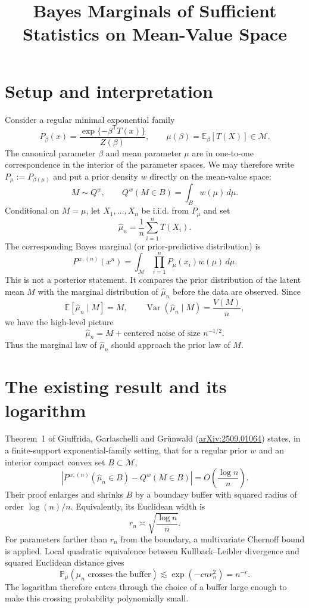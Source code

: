 \documentclass[11pt]{article}
\title{Bayes Marginals of Sufficient Statistics on Mean-Value Space}
\author{}
\date{}
\newcommand{\M}{\mathcal M}
\newcommand{\E}{\mathbb E}
\newcommand{\Pp}{\mathbb P}
\begin{document}
\maketitle

\section{Setup and interpretation}

Consider a regular minimal exponential family
\[
  P_{\beta}(x)
  =\frac{\exp\{-\beta^{\mathsf T}T(x)\}}{Z(\beta)},
  \qquad
  \mu(\beta)=\E_{\beta}[T(X)]\in\M.
\]
The canonical parameter $\beta$ and mean parameter $\mu$ are in one-to-one
correspondence in the interior of the parameter spaces.  We may therefore
write $P_{\mu}:=P_{\beta(\mu)}$ and put a prior density $w$ directly on the
mean-value space:
\[
  M\sim Q^w,\qquad Q^w(M\in B)=\int_B w(\mu)\,d\mu.
\]
Conditional on $M=\mu$, let $X_1,\ldots,X_n$ be i.i.d. from $P_\mu$ and set
\[
  \widehat\mu_n=\frac1n\sum_{i=1}^nT(X_i).
\]
The corresponding Bayes marginal (or prior-predictive distribution) is
\[
  P^{w,(n)}(x^n)
  =\int_{\M}\prod_{i=1}^nP_\mu(x_i)w(\mu)\,d\mu.
\]
This is not a posterior statement.  It compares the prior distribution of
the latent mean $M$ with the marginal distribution of $\widehat\mu_n$ before
the data are observed.  Since
\[
  \E[\widehat\mu_n\mid M]=M,
  \qquad
  \operatorname{Var}(\widehat\mu_n\mid M)=\frac{V(M)}n,
\]
we have the high-level picture
\[
  \widehat\mu_n=M+\text{centered noise of size }n^{-1/2}.
\]
Thus the marginal law of $\widehat\mu_n$ should approach the prior law of
$M$.

\section{The existing result and its logarithm}

Theorem~1 of Giuffrida, Garlaschelli and Gr\"unwald
(\href{https://arxiv.org/abs/2509.01064}{arXiv:2509.01064}) states, in a
finite-support exponential-family setting, that for a regular prior $w$ and
an interior compact convex set $B\subset\M$,
\begin{equation}\label{eq:existing}
  \left|
  P^{w,(n)}(\widehat\mu_n\in B)-Q^w(M\in B)
  \right|
  =O\!\left(\frac{\log n}{n}\right).
\end{equation}
Their proof enlarges and shrinks $B$ by a boundary buffer with squared radius
of order $\log(n)/n$.  Equivalently, its Euclidean width is
\[
  r_n\asymp\sqrt{\frac{\log n}{n}}.
\]
For parameters farther than $r_n$ from the boundary, a multivariate Chernoff
bound is applied.  Local quadratic equivalence between Kullback--Leibler
divergence and squared Euclidean distance gives
\[
  \Pp_{\mu}(\widehat\mu_n\text{ crosses the buffer})
  \lesssim \exp(-c n r_n^2)=n^{-c}.
\]
The logarithm therefore enters through the choice of a buffer large enough
to make this crossing probability polynomially small.
\end{document}

